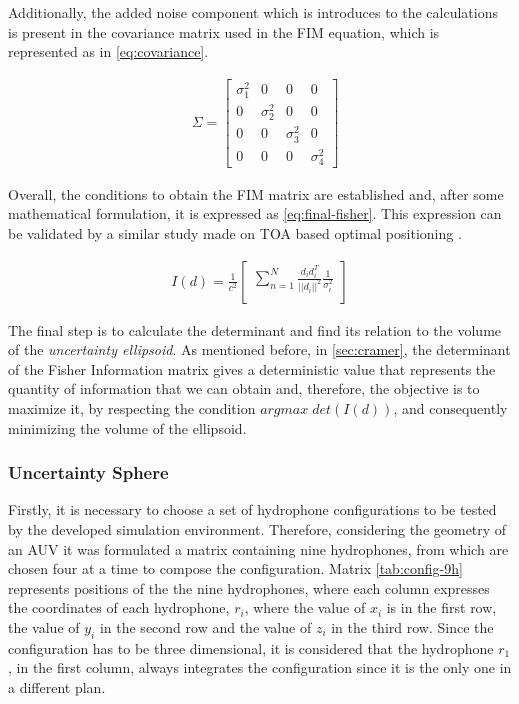 Additionally, the added noise component which is introduces to the calculations is present in the covariance matrix used in the FIM equation, which is represented as in \ref{eq:covariance}.

\begin{eqnarray}
& \Sigma = 
\begin{bmatrix}
\sigma_1^2 & 0 & 0 & 0 \\
0 & \sigma_2^2 & 0 & 0 \\
0 & 0  & \sigma_3^2  & 0 \\
0 & 0 & 0 & \sigma_4^2 
\end{bmatrix}
\label{eq:covariance}
\end{eqnarray}

Overall, the conditions to obtain the FIM matrix are established and, after some mathematical formulation, it is expressed as \ref{eq:final-fisher}. This expression can be validated by a similar study made on TOA based optimal positioning \cite{cramer-bruno}.

\begin{eqnarray}
I(d) = \frac{1}{c^2} 
\begin{bmatrix}
\sum_{n=1}^{N} \frac{d_i d_i^T}{||d_i||^2} \frac{1}{\sigma_i^2}\\
\end{bmatrix}
\label{eq:final-fisher}
\end{eqnarray}

The final step is to calculate the determinant and find its relation to the volume of the \textit{uncertainty ellipsoid}. As mentioned before, in \ref{sec:cramer}, the determinant of the Fisher Information matrix gives a deterministic value that represents the quantity of information that we can obtain and, therefore, the objective is to maximize it, by respecting the condition $argmax \; det(I(d))$, and consequently minimizing the volume of the ellipsoid. 

\subsubsection{Uncertainty Sphere}

Firstly, it is necessary to choose a set of hydrophone configurations to be tested by the developed simulation environment. Therefore, considering the geometry of an AUV it was formulated a matrix containing nine hydrophones, from which are chosen four at a time to compose the configuration. Matrix \ref{tab:config-9h} represents positions of the the nine hydrophones, where each column expresses the coordinates of each hydrophone, $r_i$, where the value of $x_i$ is in the first row, the value of $y_i$ in the second row and the value of $z_i$ in the third row. Since the configuration has to be three dimensional, it is considered that the hydrophone $r_1$, in the first column, always integrates the configuration since it is the only one in a different plan.

